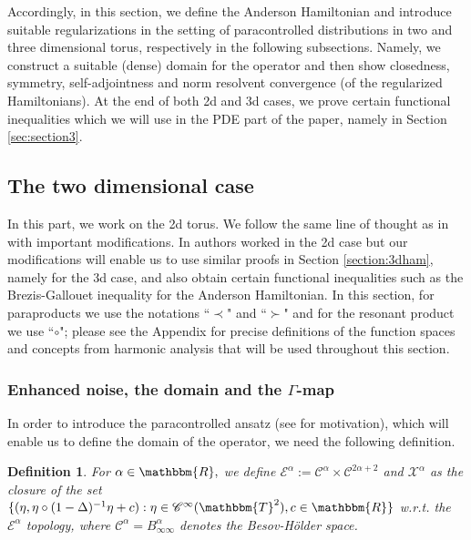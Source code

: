 \documentclass[11pt, oneside]{article}   	%
\newcommand{\assign}{:=}
\newtheorem{definition}[theorem]{Definition}
\newcommand{\CC}{\mathscr{C}}
\begin{document}
Accordingly, in this section, we define the Anderson Hamiltonian and introduce suitable regularizations in the setting of paracontrolled distributions in two and three dimensional torus, respectively in the following subsections. Namely, we construct a suitable (dense) domain for the operator and then show closedness, symmetry, self-adjointness and  norm resolvent convergence (of the regularized Hamiltonians).  At the end of both 2d and 3d cases, we prove certain functional inequalities which we will use in the PDE part of the paper, namely in Section \ref{sec:section3}.

\subsection{The two dimensional case}\label{subsec:2dham}







In this part, we work on the 2d torus.  We follow the same line of thought as in \cite{allez_continuous_2015} with important modifications.  In \cite{allez_continuous_2015} authors worked in the 2d case but  our modifications will enable us to use similar proofs in Section \ref{section:3dham}, namely for the 3d case, and also obtain certain functional inequalities such as the Brezis-Gallouet inequality for the Anderson Hamiltonian.  In this section, for paraproducts we use the notations ``$\prec$" and ``$\succ$" and for the resonant product we use ``$\circ$"; please see the Appendix for precise definitions of the function spaces and concepts from harmonic analysis that will be used throughout this section.

\subsubsection{Enhanced noise, the domain and the $\Gamma$-map}


In order to introduce the paracontrolled ansatz (see \cite[Section 3]{GP17}  for  motivation), which will enable us to define the domain of the operator, we need the following definition.

\begin{definition} \label{def:2dencNoise}
	For $\alpha \in \mathbbm{R},$ we define
	 $\mathscr{E}^{\alpha} \assign \CC^{\alpha} \times \CC^{2
		\alpha + 2}$ and 
	$ \mathscr{X}^{\alpha}$ as the closure of the set $\{
	(\eta, \eta \circ (1 - \Delta)^{- 1} \eta + c) : \eta \in \CC^{\infty}
	(\mathbbm{T}^2), c \in \mathbbm{R} \}$ w.r.t. the 
	$\mathscr{E}^{\alpha}$ topology,
	where $\CC^{\alpha} = B_{\infty \infty}^{\alpha}$ denotes the Besov-H\"older space.
\end{definition}
\end{document}
